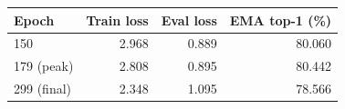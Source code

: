\begin{tabular}{lrrr}
\toprule
Epoch & Train loss & Eval loss & EMA top-1 (\%) \\
\midrule
150 & 2.968 & 0.889 & 80.060 \\
179 (peak) & 2.808 & 0.895 & 80.442 \\
299 (final) & 2.348 & 1.095 & 78.566 \\
\bottomrule
\end{tabular}
